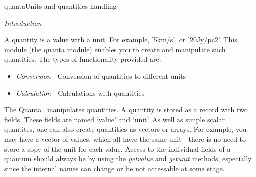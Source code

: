\begin{ahmodule}{quanta}{Units and quantities handling}




\begin{ahdescription}

\bigskip

{\it Introduction}

A quantity is a value with a unit.  For example, '5km/s', or '20Jy/pc2'. 
This module (the {\mf quanta} module) enables you to create and
manipulate such quantities.  The types of functionality provided are:

\begin{itemize}
\item {\em Conversion} - Conversion of quantities  to different units
\item {\em Calculation} - Calculations with quantities
\end{itemize}


The Quanta \tool\ manipulates quantities.  A quantity is stored as a
record with two fields.  These fields are named `value' and
`unit'.  As well as simple scalar quantites, one can also create
quantities as vectors or arrays.  For example, you may have a vector of
values, which all have the same unit - there is no need to store a copy
of the unit for each value. Access to the individual fields of a quantum
should always be by using the {\em getvalue} and {\em getunit} methods,
especially since the internal names can change or be not accessable at some
stage. 



\end{ahdescription}
\end{ahmodule}
